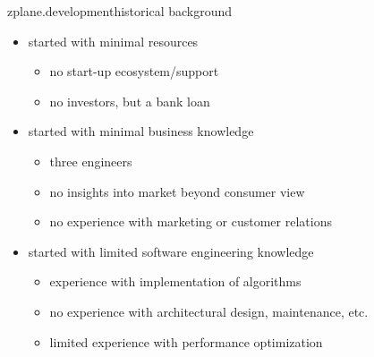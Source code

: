        \begin{frame}{zplane.development}{historical background}
					\begin{itemize}
						\item started with minimal resources
							\begin{itemize}
								\item no start-up ecosystem/support
								\item no investors, but a bank loan
							\end{itemize}
							\bigskip
							\item	started with minimal business knowledge
								\begin{itemize}
									\item three engineers
									\item	no insights into market beyond consumer view
									\item no experience with marketing or customer relations
								\end{itemize}
							\bigskip
							\item	started with limited software engineering knowledge
								\begin{itemize}
									\item experience with implementation of algorithms
									\item no experience with architectural design, maintenance, etc.
									\item limited experience with performance optimization
								\end{itemize}
					\end{itemize}
        \end{frame}
				
